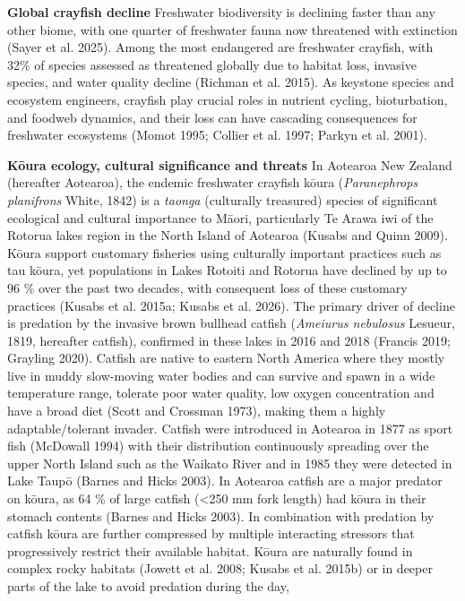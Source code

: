 \documentclass[
  12pt,
  a4paper,
]{scrbook}
\begin{document}
\textbf{Global crayfish decline} Freshwater biodiversity is declining
faster than any other biome, with one quarter of freshwater fauna now
threatened with extinction (Sayer et al. 2025). Among the most
endangered are freshwater crayfish, with 32\% of species assessed as
threatened globally due to habitat loss, invasive species, and water
quality decline (Richman et al. 2015). As keystone species and ecosystem
engineers, crayfish play crucial roles in nutrient cycling,
bioturbation, and foodweb dynamics, and their loss can have cascading
consequences for freshwater ecosystems (Momot 1995; Collier et al. 1997;
Parkyn et al. 2001).

\textbf{Kōura ecology, cultural significance and threats} In Aotearoa
New Zealand (hereafter Aotearoa), the endemic freshwater crayfish kōura
(\emph{Paranephrops planifrons} White, 1842) is a \emph{taonga}
(culturally treasured) species of significant ecological and cultural
importance to Māori, particularly Te Arawa iwi of the Rotorua lakes
region in the North Island of Aotearoa (Kusabs and Quinn 2009). Kōura
support customary fisheries using culturally important practices such as
tau kōura, yet populations in Lakes Rotoiti and Rotorua have declined by
up to 96 \% over the past two decades, with consequent loss of these
customary practices (Kusabs et al. 2015a; Kusabs et al. 2026). The
primary driver of decline is predation by the invasive brown bullhead
catfish (\emph{Ameiurus nebulosus} Lesueur, 1819, hereafter catfish),
confirmed in these lakes in 2016 and 2018 (Francis 2019; Grayling 2020).
Catfish are native to eastern North America where they mostly live in
muddy slow-moving water bodies and can survive and spawn in a wide
temperature range, tolerate poor water quality, low oxygen concentration
and have a broad diet (Scott and Crossman 1973), making them a highly
adaptable/tolerant invader. Catfish were introduced in Aotearoa in 1877
as sport fish (McDowall 1994) with their distribution continuously
spreading over the upper North Island such as the Waikato River and in
1985 they were detected in Lake Taupō (Barnes and Hicks 2003). In
Aotearoa catfish are a major predator on kōura, as 64 \% of large
catfish (\textless250 mm fork length) had kōura in their stomach
contents (Barnes and Hicks 2003). In combination with predation by
catfish kōura are further compressed by multiple interacting stressors
that progressively restrict their available habitat. Kōura are naturally
found in complex rocky habitats (Jowett et al. 2008; Kusabs et al.
2015b) or in deeper parts of the lake to avoid predation during the day,
\end{document}
